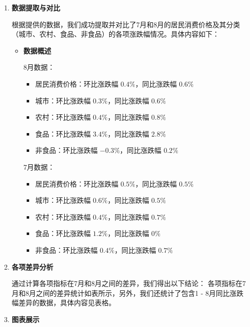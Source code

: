 \begin{gptbox}
\footnotesize{
    \begin{enumerate}
        \item \noindent\textbf{数据提取与对比}
        
            根据提供的数据，我们成功提取并对比了7月和8月的居民消费价格及其分类（城市、农村、食品、非食品）的各项涨跌幅情况。具体内容如下：
            \begin{itemize}
                \item \noindent\textbf{数据概述}
                
                    8月数据：
                    \begin{itemize}
                        \item 居民消费价格：环比涨跌幅 \(0.4\%\)，同比涨跌幅 \(0.6\%\) 
                        \item 城市：环比涨跌幅 \(0.3\%\)，同比涨跌幅 \(0.6\%\) 
                        \item 农村：环比涨跌幅 \(0.4\%\)，同比涨跌幅 \(0.8\%\) 
                        \item 食品：环比涨跌幅 \(3.4\%\)，同比涨跌幅 \(2.8\%\) 
                        \item 非食品：环比涨跌幅 \(-0.3\%\)，同比涨跌幅 \(0.2\%\) 
                    \end{itemize}
                    7月数据：
                    \begin{itemize}
                        \item 居民消费价格：环比涨跌幅 \(0.5\%\)，同比涨跌幅 \(0.5\%\) 
                        \item 城市：环比涨跌幅 \(0.6\%\)，同比涨跌幅 \(0.5\%\) 
                        \item 农村：环比涨跌幅 \(0.4\%\)，同比涨跌幅 \(0.7\%\) 
                        \item 食品：环比涨跌幅 \(1.2\%\)，同比涨跌幅 \(0\%\) 
                        \item 非食品：环比涨跌幅 \(0.4\%\)，同比涨跌幅 \(0.7\%\) 
                    \end{itemize}
            \end{itemize}
        \item \noindent\textbf{各项差异分析}
        
            通过计算各项指标在7月和8月之间的差异，我们得出以下结论：
            各项指标在7月和8月之间的差异统计如表所示，另外，我们还统计了包含1 - 8月同比涨跌幅差异的数据，具体内容见表格。
        \item \noindent\textbf{图表展示}
        

\end{enumerate}}
\end{gptbox}
